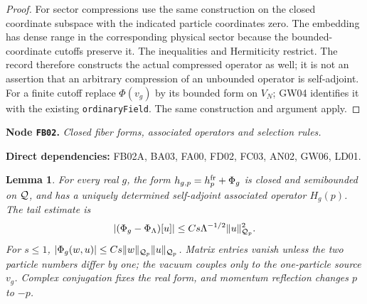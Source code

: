 \documentclass[11pt,a4paper]{article}
\newtheorem{lemma}[theorem]{Lemma}
\theoremstyle{remark}\newtheorem{remark}[theorem]{Remark}
\newcommand{\node}[3]{\par\Needspace{6\baselineskip}\smallskip\hypertarget{node:#1}{}\label{nodepage:#1}\noindent\textbf{Node \texttt{#1}.} \textit{#2.}\par\noindent\textbf{Direct dependencies:} #3.\par}
\begin{document}
\begin{proof}
For sector compressions use the same construction on the closed coordinate subspace with the indicated particle coordinates zero. The embedding has dense range in the corresponding physical sector because the bounded-coordinate cutoffs preserve it. The inequalities and Hermiticity restrict. The record therefore constructs the actual compressed operator as well; it is not an assertion that an arbitrary compression of an unbounded operator is self-adjoint. For a finite cutoff replace $\Phi(v_g)$ by its bounded form on $V_N$; GW04 identifies it with the existing \texttt{ordinaryField}. The same construction and argument apply.
\end{proof}

\node{FB02}{Closed fiber forms, associated operators and selection rules}{FB02A, BA03, FA00, FD02, FC03, AN02, GW06, LD01}
\begin{lemma}\label{lem:cutoff}
For every real $g$, the form
$h_{g,p}=h_p^{\rm fr}+\Phi_g$ is closed and semibounded on $\mathcal Q$, and has a uniquely determined self-adjoint associated operator $H_g(p)$. The tail estimate is
\begin{equation}
 |(\Phi_g-\Phi_\Lambda)[u]|
 \leq Cs\Lambda^{-1/2}\|u\|_{\mathcal Q_p}^2.
 \label{eq:tailform}
\end{equation}
For $s\leq1$, $|\Phi_g(w,u)|\leq Cs\|w\|_{\mathcal Q_p}\|u\|_{\mathcal Q_p}$. Matrix entries vanish unless the two particle numbers differ by one; the vacuum couples only to the one-particle source $v_g$. Complex conjugation fixes the real form, and momentum reflection changes $p$ to $-p$.
\end{lemma}
\end{document}
